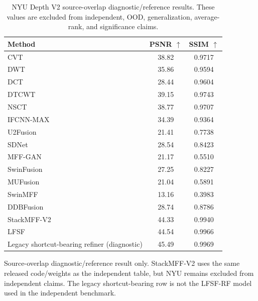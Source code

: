 \begin{table}[t]
\centering
\caption{NYU Depth V2 source-overlap diagnostic/reference results. These values are excluded from independent, OOD, generalization, average-rank, and significance claims.}
\label{tab:nyu_diagnostic}
\small
\setlength{\tabcolsep}{9pt}
\renewcommand{\arraystretch}{1.06}
\begin{tabular}{@{}lcc@{}}
\toprule
Method & PSNR $\uparrow$ & SSIM $\uparrow$ \\
\midrule
CVT & 38.82 & 0.9717 \\
DWT & 35.86 & 0.9594 \\
DCT & 28.44 & 0.9604 \\
DTCWT & 39.15 & 0.9743 \\
NSCT & 38.77 & 0.9707 \\
IFCNN-MAX & 34.39 & 0.9364 \\
U2Fusion & 21.41 & 0.7738 \\
SDNet & 28.54 & 0.8423 \\
MFF-GAN & 21.17 & 0.5510 \\
SwinFusion & 27.25 & 0.8227 \\
MUFusion & 21.04 & 0.5891 \\
SwinMFF & 13.16 & 0.3983 \\
DDBFusion & 28.74 & 0.8786 \\
StackMFF-V2 & 44.33 & 0.9940 \\
LFSF & 44.54 & 0.9966 \\
Legacy shortcut-bearing refiner (diagnostic) & 45.49 & 0.9969 \\
\bottomrule
\end{tabular}
\vspace{2pt}
\footnotesize{Source-overlap diagnostic/reference result only. StackMFF-V2 uses the same released code/weights as the independent table, but NYU remains excluded from independent claims. The legacy shortcut-bearing row is not the LFSF-RF model used in the independent benchmark.}
\end{table}
